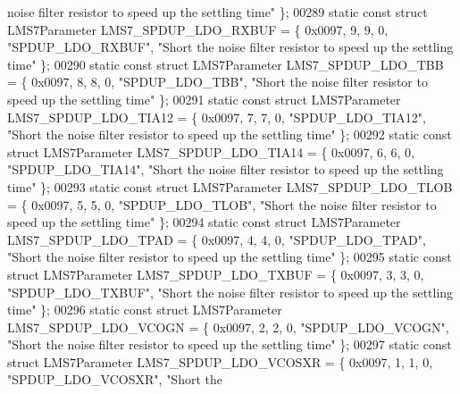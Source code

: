 \begin{DoxyCode}
{       noise filter resistor to speed up the settling time"} \};
00289 \textcolor{keyword}{static} \textcolor{keyword}{const} \textcolor{keyword}{struct }LMS7Parameter LMS7_SPDUP_LDO_RXBUF = \{ 0x0097, 9, 9, 0, \textcolor{stringliteral}{"SPDUP\_LDO\_RXBUF"}, \textcolor{stringliteral}{"Short the
       noise filter resistor to speed up the settling time"} \};
00290 \textcolor{keyword}{static} \textcolor{keyword}{const} \textcolor{keyword}{struct }LMS7Parameter LMS7_SPDUP_LDO_TBB = \{ 0x0097, 8, 8, 0, \textcolor{stringliteral}{"SPDUP\_LDO\_TBB"}, \textcolor{stringliteral}{"Short the noise
       filter resistor to speed up the settling time"} \};
00291 \textcolor{keyword}{static} \textcolor{keyword}{const} \textcolor{keyword}{struct }LMS7Parameter LMS7_SPDUP_LDO_TIA12 = \{ 0x0097, 7, 7, 0, \textcolor{stringliteral}{"SPDUP\_LDO\_TIA12"}, \textcolor{stringliteral}{"Short the
       noise filter resistor to speed up the settling time"} \};
00292 \textcolor{keyword}{static} \textcolor{keyword}{const} \textcolor{keyword}{struct }LMS7Parameter LMS7_SPDUP_LDO_TIA14 = \{ 0x0097, 6, 6, 0, \textcolor{stringliteral}{"SPDUP\_LDO\_TIA14"}, \textcolor{stringliteral}{"Short the
       noise filter resistor to speed up the settling time"} \};
00293 \textcolor{keyword}{static} \textcolor{keyword}{const} \textcolor{keyword}{struct }LMS7Parameter LMS7_SPDUP_LDO_TLOB = \{ 0x0097, 5, 5, 0, \textcolor{stringliteral}{"SPDUP\_LDO\_TLOB"}, \textcolor{stringliteral}{"Short the
       noise filter resistor to speed up the settling time"} \};
00294 \textcolor{keyword}{static} \textcolor{keyword}{const} \textcolor{keyword}{struct }LMS7Parameter LMS7_SPDUP_LDO_TPAD = \{ 0x0097, 4, 4, 0, \textcolor{stringliteral}{"SPDUP\_LDO\_TPAD"}, \textcolor{stringliteral}{"Short the
       noise filter resistor to speed up the settling time"} \};
00295 \textcolor{keyword}{static} \textcolor{keyword}{const} \textcolor{keyword}{struct }LMS7Parameter LMS7_SPDUP_LDO_TXBUF = \{ 0x0097, 3, 3, 0, \textcolor{stringliteral}{"SPDUP\_LDO\_TXBUF"}, \textcolor{stringliteral}{"Short the
       noise filter resistor to speed up the settling time"} \};
00296 \textcolor{keyword}{static} \textcolor{keyword}{const} \textcolor{keyword}{struct }LMS7Parameter LMS7_SPDUP_LDO_VCOGN = \{ 0x0097, 2, 2, 0, \textcolor{stringliteral}{"SPDUP\_LDO\_VCOGN"}, \textcolor{stringliteral}{"Short the
       noise filter resistor to speed up the settling time"} \};
00297 \textcolor{keyword}{static} \textcolor{keyword}{const} \textcolor{keyword}{struct }LMS7Parameter LMS7_SPDUP_LDO_VCOSXR = \{ 0x0097, 1, 1, 0, \textcolor{stringliteral}{"SPDUP\_LDO\_VCOSXR"}, \textcolor{stringliteral}{"Short the
}
\end{DoxyCode}
